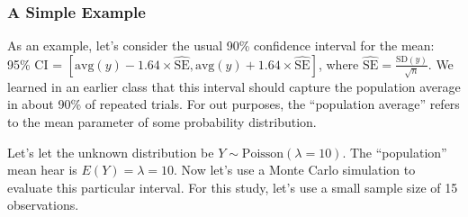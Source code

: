 \documentclass[
]{book}
\newenvironment{Shaded}{\begin{snugshade}}{\end{snugshade}}
\newcommand{\AttributeTok}[1]{\textcolor[rgb]{0.77,0.63,0.00}{#1}}
\newcommand{\CommentTok}[1]{\textcolor[rgb]{0.56,0.35,0.01}{\textit{#1}}}
\newcommand{\ControlFlowTok}[1]{\textcolor[rgb]{0.13,0.29,0.53}{\textbf{#1}}}
\newcommand{\DecValTok}[1]{\textcolor[rgb]{0.00,0.00,0.81}{#1}}
\newcommand{\FloatTok}[1]{\textcolor[rgb]{0.00,0.00,0.81}{#1}}
\newcommand{\FunctionTok}[1]{\textcolor[rgb]{0.00,0.00,0.00}{#1}}
\newcommand{\NormalTok}[1]{#1}
\newcommand{\OtherTok}[1]{\textcolor[rgb]{0.56,0.35,0.01}{#1}}
\newcommand{\SpecialCharTok}[1]{\textcolor[rgb]{0.00,0.00,0.00}{#1}}
\begin{document}
\hypertarget{a-simple-example}{%
\subsubsection{A Simple Example}\label{a-simple-example}}

As an example, let's consider the usual 90\% confidence interval for the
mean: 95\% CI =
\([\text{avg}(y) - 1.64 \times \hat{\text{SE}}, \text{avg}(y) + 1.64 \times \hat{\text{SE}}]\),
where \(\hat{\text{SE}} = \frac{\text{SD}(y)}{\sqrt{n}}\). We learned in
an earlier class that this interval should capture the population
average in about 90\% of repeated trials. For out purposes, the
``population average'' refers to the mean parameter of some probability
distribution.

Let's let the unknown distribution be
\(Y \sim \text{Poisson}(\lambda = 10)\). The ``population'' mean hear is
\(E(Y) = \lambda = 10\). Now let's use a Monte Carlo simulation to
evaluate this particular interval. For this study, let's use a small
sample size of 15 observations.

\begin{Shaded}
\end{Shaded}
\end{document}
